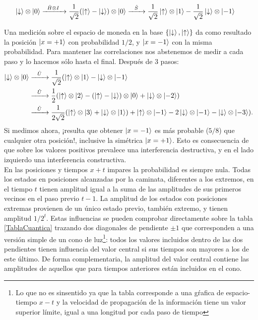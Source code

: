 \begin{align}
\ket{\downarrow}\otimes\ket{0}&\xrightarrow{\;\;\hat{H}\otimes I\;\;\;}\dfrac{1}{\sqrt{2}}(\ket{\uparrow}-\ket{\downarrow})\otimes\ket{0}
\xrightarrow{\;\;\;\hat{S}\;\;\;}\dfrac{1}{\sqrt{2}}\ket{\uparrow}\otimes\ket{1}-\dfrac{1}{\sqrt{2}}\ket{\downarrow}\otimes\ket{-1}
\end{align}{}

Una medición sobre el espacio de moneda en la base $\{\ket{\downarrow},\ket{\uparrow}\}$ da como resultado la posición $\ket{x=+1}$ con probabilidad $1/2$, y $\ket{x=-1}$ con la misma probabilidad.
Para mantener las correlaciones nos abstenemos de medir a cada paso y lo hacemos sólo hasta el final. Después de 3 pasos:
\begin{align}
\ket{\downarrow}\otimes\ket{0}&\xrightarrow{\;\;\;\hat{U}\;\;\;}\dfrac{1}{\sqrt{2}}(\ket{\uparrow}\otimes\ket{1}-\ket{\downarrow}\otimes\ket{-1}\\
&\xrightarrow{\;\;\;\hat{U}\;\;\;}\dfrac{1}{2}(\ket{\uparrow}\otimes\ket{2}-(\ket{\uparrow}-\ket{\downarrow})\otimes\ket{0}+\ket{\downarrow}\otimes\ket{-2})\\
&\xrightarrow{\;\;\;\hat{U}\;\;\;}\dfrac{1}{2\sqrt{2}}(\ket{\uparrow}\otimes\ket{3}+\ket{\downarrow}\otimes\ket{1})+\ket{\uparrow}\otimes\ket{-1}-2\ket{\downarrow}\otimes\ket{-1}-\ket{\downarrow}\otimes\ket{-3}).
\end{align}{}
Si medimos ahora, ¡resulta que obtener $\ket{x=-1}$ es más probable ($5/8$) que cualquier otra posición!, inclusive la simétrica $\ket{x=+1}$. Esto es consecuencia de que sobre los valores positivos prevalece una interferencia destructiva, y en el lado izquierdo una interferencia constructiva.\\

En las posiciones y tiempos $x+t$ impares la probabilidad es siempre nula. Todas los estados en posiciones alcanzadas por la caminata, diferentes a los extremos, en el tiempo $t$ tienen amplitud igual a la suma de las amplitudes de sus primeros vecinos en el paso previo $t-1$. La amplitud de los estados con posiciones extremas provienen de un único estado previo, también extremo, y tienen amplitud $1/2^t$. 
Estas influencias se pueden comprobar directamente sobre la tabla \ref{TablaCuantica} trazando dos diagonales de pendiente $\pm1$ que corresponden a una versión simple de un cono de luz\footnote{Lo que no es sinsentido ya que la tabla corresponde a una gŕafica de espacio-tiempo $x-t$ y la velocidad de propagación de la información tiene un valor superior límite, igual a una longitud por cada paso de tiempo}: todos los valores incluidos dentro de las dos pendientes tienen influencia del valor central si sus tiempos son mayores a los de este último. De forma complementaria, la amplitud del valor central contiene las amplitudes de aquellos que para tiempos anteriores están incluidos en el cono.

